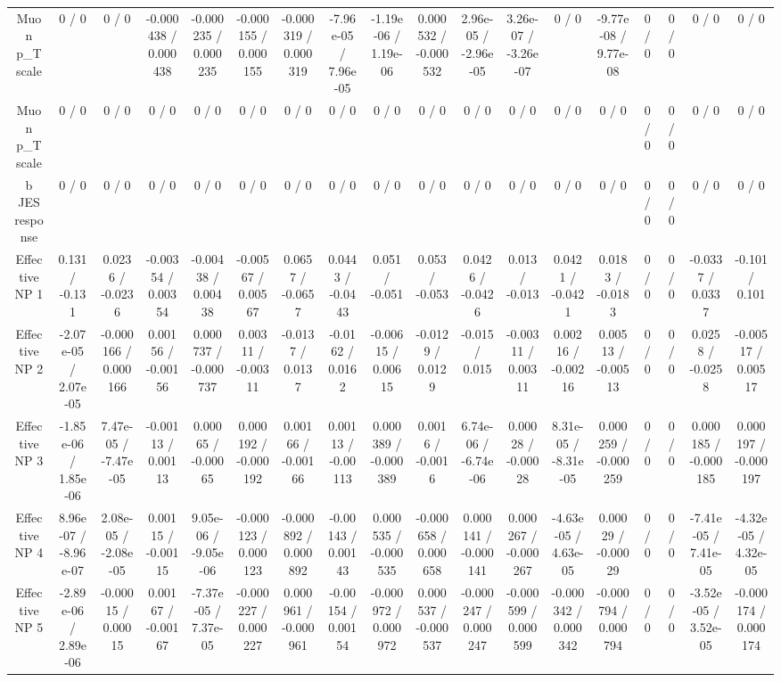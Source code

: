\documentclass[10pt]{article}
\begin{document}
\begin{table}[htbp]
\begin{center}
\begin{tabular}{|c|c|c|c|c|c|c|c|c|c|c|c|c|c|c|c|c|c|}
  Muon p_{T} scale & 0 / 0 & 0 / 0 & -0.000438 / 0.000438 & -0.000235 / 0.000235 & -0.000155 / 0.000155 & -0.000319 / 0.000319 & -7.96e-05 / 7.96e-05 & -1.19e-06 / 1.19e-06 & 0.000532 / -0.000532 & 2.96e-05 / -2.96e-05 & 3.26e-07 / -3.26e-07 & 0 / 0 & -9.77e-08 / 9.77e-08 & 0 / 0 & 0 / 0 & 0 / 0 & 0 / 0 \\ 
  Muon p_{T} scale & 0 / 0 & 0 / 0 & 0 / 0 & 0 / 0 & 0 / 0 & 0 / 0 & 0 / 0 & 0 / 0 & 0 / 0 & 0 / 0 & 0 / 0 & 0 / 0 & 0 / 0 & 0 / 0 & 0 / 0 & 0 / 0 & 0 / 0 \\ 
  b JES response & 0 / 0 & 0 / 0 & 0 / 0 & 0 / 0 & 0 / 0 & 0 / 0 & 0 / 0 & 0 / 0 & 0 / 0 & 0 / 0 & 0 / 0 & 0 / 0 & 0 / 0 & 0 / 0 & 0 / 0 & 0 / 0 & 0 / 0 \\ 
  Effective NP 1 & 0.131 / -0.131 & 0.0236 / -0.0236 & -0.00354 / 0.00354 & -0.00438 / 0.00438 & -0.00567 / 0.00567 & 0.0657 / -0.0657 & 0.0443 / -0.0443 & 0.051 / -0.051 & 0.053 / -0.053 & 0.0426 / -0.0426 & 0.013 / -0.013 & 0.0421 / -0.0421 & 0.0183 / -0.0183 & 0 / 0 & 0 / 0 & -0.0337 / 0.0337 & -0.101 / 0.101 \\ 
  Effective NP 2 & -2.07e-05 / 2.07e-05 & -0.000166 / 0.000166 & 0.00156 / -0.00156 & 0.000737 / -0.000737 & 0.00311 / -0.00311 & -0.0137 / 0.0137 & -0.0162 / 0.0162 & -0.00615 / 0.00615 & -0.0129 / 0.0129 & -0.015 / 0.015 & -0.00311 / 0.00311 & 0.00216 / -0.00216 & 0.00513 / -0.00513 & 0 / 0 & 0 / 0 & 0.0258 / -0.0258 & -0.00517 / 0.00517 \\ 
  Effective NP 3 & -1.85e-06 / 1.85e-06 & 7.47e-05 / -7.47e-05 & -0.00113 / 0.00113 & 0.00065 / -0.00065 & 0.000192 / -0.000192 & 0.00166 / -0.00166 & 0.00113 / -0.00113 & 0.000389 / -0.000389 & 0.0016 / -0.0016 & 6.74e-06 / -6.74e-06 & 0.00028 / -0.00028 & 8.31e-05 / -8.31e-05 & 0.000259 / -0.000259 & 0 / 0 & 0 / 0 & 0.000185 / -0.000185 & 0.000197 / -0.000197 \\ 
  Effective NP 4 & 8.96e-07 / -8.96e-07 & 2.08e-05 / -2.08e-05 & 0.00115 / -0.00115 & 9.05e-06 / -9.05e-06 & -0.000123 / 0.000123 & -0.000892 / 0.000892 & -0.00143 / 0.00143 & 0.000535 / -0.000535 & -0.000658 / 0.000658 & 0.000141 / -0.000141 & 0.000267 / -0.000267 & -4.63e-05 / 4.63e-05 & 0.00029 / -0.00029 & 0 / 0 & 0 / 0 & -7.41e-05 / 7.41e-05 & -4.32e-05 / 4.32e-05 \\ 
  Effective NP 5 & -2.89e-06 / 2.89e-06 & -0.00015 / 0.00015 & 0.00167 / -0.00167 & -7.37e-05 / 7.37e-05 & -0.000227 / 0.000227 & 0.000961 / -0.000961 & -0.00154 / 0.00154 & -0.000972 / 0.000972 & 0.000537 / -0.000537 & -0.000247 / 0.000247 & -0.000599 / 0.000599 & -0.000342 / 0.000342 & -0.000794 / 0.000794 & 0 / 0 & 0 / 0 & -3.52e-05 / 3.52e-05 & -0.000174 / 0.000174 \\ 

\end{tabular}
\end{center}
\end{table}
\end{document}
